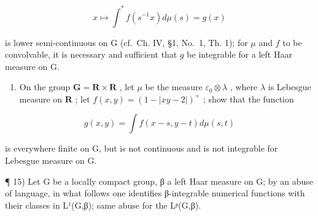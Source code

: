 \[
x \mapsto \int^ {*} f (s ^ {- 1} x) d \mu (s) = g (x)
\]

is lower semi-continuous on G (cf.~Ch. IV, §1, No.~1, Th. 1); for \(\mu\) and \(f\) to be convolvable, it is necessary and sufficient that \(g\) be integrable for a left Haar measure on G.

\begin{enumerate}
\def\labelenumi{\alph{enumi})}
\setcounter{enumi}{1}
\tightlist
\item
  On the group \(\mathbf{G} = \mathbf{R} \times \mathbf{R}\) , let \(\mu\) be the measure \(\varepsilon_0 \otimes \lambda\) , where \(\lambda\) is Lebesgue measure on \(\mathbf{R}\) ; let \(f(x, y) = (1 - |xy - 2|)^+\) ; show that the function
\end{enumerate}

\[
g (x, y) = \int f (x - s, y - t) d \mu (s, t)
\]

is everywhere finite on G, but is not continuous and is not integrable for Lebesgue measure on G.

¶ 15) Let G be a locally compact group, β a left Haar measure on G; by an abuse of language, in what follows one identifies β-integrable numerical functions with their classes in L¹(G,β); same abuse for the Lᵖ(G,β).


